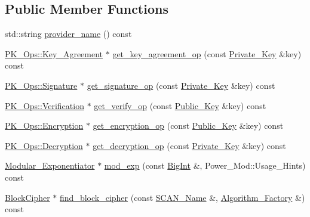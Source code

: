\subsection*{Public Member Functions}
\begin{DoxyCompactItemize}
\item 
std\-::string \hyperlink{classBotan_1_1OpenSSL__Engine_ab371032b5927818ad370e14616922e3d}{provider\-\_\-name} () const 
\item 
\hyperlink{classBotan_1_1PK__Ops_1_1Key__Agreement}{P\-K\-\_\-\-Ops\-::\-Key\-\_\-\-Agreement} $\ast$ \hyperlink{classBotan_1_1OpenSSL__Engine_aad62c47cfd476b03a6c0275176466621}{get\-\_\-key\-\_\-agreement\-\_\-op} (const \hyperlink{classBotan_1_1Private__Key}{Private\-\_\-\-Key} \&key) const 
\item 
\hyperlink{classBotan_1_1PK__Ops_1_1Signature}{P\-K\-\_\-\-Ops\-::\-Signature} $\ast$ \hyperlink{classBotan_1_1OpenSSL__Engine_a5cf67e2da55c3e70640c92e7a98ef96d}{get\-\_\-signature\-\_\-op} (const \hyperlink{classBotan_1_1Private__Key}{Private\-\_\-\-Key} \&key) const 
\item 
\hyperlink{classBotan_1_1PK__Ops_1_1Verification}{P\-K\-\_\-\-Ops\-::\-Verification} $\ast$ \hyperlink{classBotan_1_1OpenSSL__Engine_a36bd2611ea69bbe4349586449d01c463}{get\-\_\-verify\-\_\-op} (const \hyperlink{classBotan_1_1Public__Key}{Public\-\_\-\-Key} \&key) const 
\item 
\hyperlink{classBotan_1_1PK__Ops_1_1Encryption}{P\-K\-\_\-\-Ops\-::\-Encryption} $\ast$ \hyperlink{classBotan_1_1OpenSSL__Engine_ae61d5132421007829dfe6a196103c264}{get\-\_\-encryption\-\_\-op} (const \hyperlink{classBotan_1_1Public__Key}{Public\-\_\-\-Key} \&key) const 
\item 
\hyperlink{classBotan_1_1PK__Ops_1_1Decryption}{P\-K\-\_\-\-Ops\-::\-Decryption} $\ast$ \hyperlink{classBotan_1_1OpenSSL__Engine_aaffe790e5d338a291d3fdf46c47110bd}{get\-\_\-decryption\-\_\-op} (const \hyperlink{classBotan_1_1Private__Key}{Private\-\_\-\-Key} \&key) const 
\item 
\hyperlink{classBotan_1_1Modular__Exponentiator}{Modular\-\_\-\-Exponentiator} $\ast$ \hyperlink{classBotan_1_1OpenSSL__Engine_a2db0b18ba329fa4f34d95bbc97b3107a}{mod\-\_\-exp} (const \hyperlink{classBotan_1_1BigInt}{Big\-Int} \&, Power\-\_\-\-Mod\-::\-Usage\-\_\-\-Hints) const 
\item 
\hyperlink{classBotan_1_1BlockCipher}{Block\-Cipher} $\ast$ \hyperlink{classBotan_1_1OpenSSL__Engine_a727c7f6759b0818b35dbe9b4ad4ff8b6}{find\-\_\-block\-\_\-cipher} (const \hyperlink{classBotan_1_1SCAN__Name}{S\-C\-A\-N\-\_\-\-Name} \&, \hyperlink{classBotan_1_1Algorithm__Factory}{Algorithm\-\_\-\-Factory} \&) const 

\end{DoxyCompactItemize}
